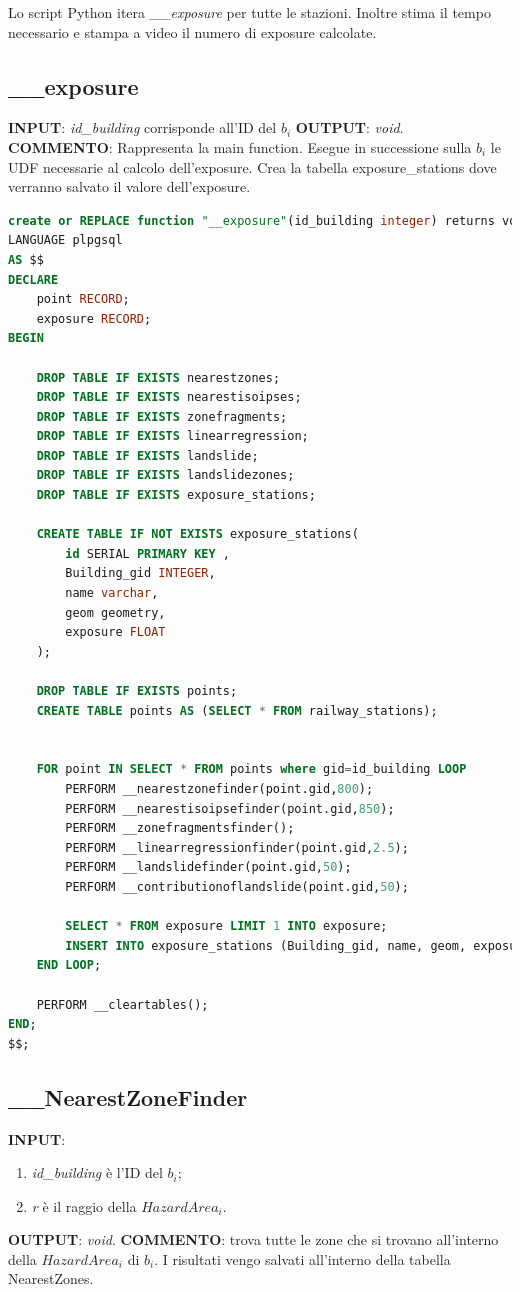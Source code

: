 Lo script Python itera \textit{\_\_exposure} per tutte le stazioni. Inoltre stima il tempo necessario e stampa a video il numero di exposure calcolate.

\subsection{\_\_exposure}
\textbf{INPUT}: \textit{id\_building} corrisponde all'ID del $b_i$ \newline
\textbf{OUTPUT}: \textit{void}. \newline
\textbf{COMMENTO}: Rappresenta la main function. Esegue in successione sulla $b_i$ le UDF necessarie al calcolo dell'exposure. Crea la tabella exposure\_stations dove verranno salvato il valore dell'exposure.   

\begin{lstlisting}[language=SQL]
create or REPLACE function "__exposure"(id_building integer) returns void
LANGUAGE plpgsql
AS $$
DECLARE
	point RECORD;
	exposure RECORD;
BEGIN

	DROP TABLE IF EXISTS nearestzones;
	DROP TABLE IF EXISTS nearestisoipses;
	DROP TABLE IF EXISTS zonefragments;
	DROP TABLE IF EXISTS linearregression;
	DROP TABLE IF EXISTS landslide;
	DROP TABLE IF EXISTS landslidezones;
	DROP TABLE IF EXISTS exposure_stations;

	CREATE TABLE IF NOT EXISTS exposure_stations(
		id SERIAL PRIMARY KEY ,
		Building_gid INTEGER,
		name varchar,
		geom geometry,
		exposure FLOAT
	);

	DROP TABLE IF EXISTS points;
	CREATE TABLE points AS (SELECT * FROM railway_stations);


	FOR point IN SELECT * FROM points where gid=id_building LOOP
		PERFORM __nearestzonefinder(point.gid,800);
		PERFORM __nearestisoipsefinder(point.gid,850);
		PERFORM __zonefragmentsfinder();
		PERFORM __linearregressionfinder(point.gid,2.5);
		PERFORM __landslidefinder(point.gid,50);
		PERFORM __contributionoflandslide(point.gid,50);

		SELECT * FROM exposure LIMIT 1 INTO exposure;
		INSERT INTO exposure_stations (Building_gid, name, geom, exposure) VALUES (exposure.id, exposure.name, exposure.geom, exposure.exposure);
	END LOOP;

	PERFORM __cleartables();
END;
$$;
\end{lstlisting}

\subsection{\_\_NearestZoneFinder}
\textbf{INPUT}: 
\begin{enumerate}
	\item \textit{id\_building} è l'ID del $b_i$;
	\item \textit{r} è il raggio della $HazardArea_i$.
\end{enumerate}
\textbf{OUTPUT}: \textit{void}. \newline
\textbf{COMMENTO}: trova tutte le zone che si trovano all'interno della $HazardArea_i$ di $b_i$. I risultati vengo salvati all'interno della tabella NearestZones.


